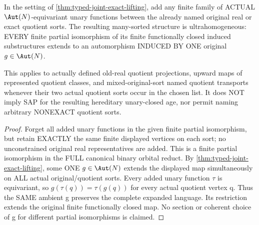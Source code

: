 \begin{corollary}
\label{cor:typed-joint-exact-equivariant-unary}
In the setting of
\cref{thm:typed-joint-exact-lifting}, add any
finite family of ACTUAL $\Aut(N)$-equivariant
unary functions between the already named
original real or exact quotient sorts.
The resulting many-sorted structure is
ultrahomogeneous: EVERY finite partial
isomorphism of its finite functionally
closed induced substructures extends to
an automorphism INDUCED BY ONE original
$g\in\Aut(N)$.

This applies to actually defined
old-real quotient projections, upward
maps of represented quotient classes,
and mixed-original-sort named quotient
transports whenever their two actual
quotient sorts occur in the chosen list.
It does NOT imply SAP for the resulting
hereditary unary-closed age, nor permit
naming arbitrary NONEXACT quotient sorts.
\end{corollary}
\begin{proof}
Forget all added unary functions in
the given finite partial isomorphism,
but retain EXACTLY the same finite
displayed vertices on each sort; no
unconstrained original real
representatives are added. This is
a finite partial isomorphism in
the FULL canonical binary orbital
reduct. By
\cref{thm:typed-joint-exact-lifting},
some ONE $g\in\Aut(N)$ extends the
displayed map simultaneously on ALL
actual original/quotient sorts.
Every added unary function $\tau$
is equivariant, so
$g(\tau(q))=\tau(g(q))$
for every actual quotient vertex q.
Thus the SAME ambient g preserves
the complete expanded language.
Its restriction extends the original
finite functionally closed map.
No section or coherent choice of g
for different partial isomorphisms
is claimed.
\end{proof}

